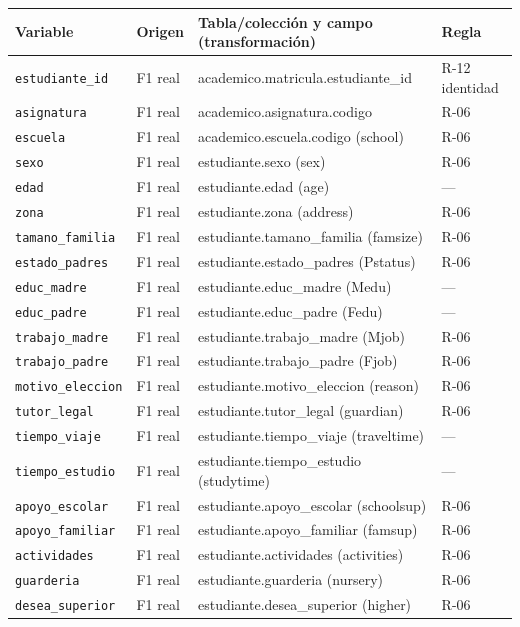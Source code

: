 \begin{tabular}{p{3.9cm}p{2.0cm}p{6.8cm}p{2.2cm}}
\toprule
Variable & Origen & Tabla/colección y campo (transformación) & Regla \\
\midrule
\texttt{estudiante\_id} & F1 real & academico.matricula.estudiante\_id & R-12 identidad \\
\texttt{asignatura} & F1 real & academico.asignatura.codigo & R-06 \\
\texttt{escuela} & F1 real & academico.escuela.codigo (school) & R-06 \\
\texttt{sexo} & F1 real & estudiante.sexo (sex) & R-06 \\
\texttt{edad} & F1 real & estudiante.edad (age) & — \\
\texttt{zona} & F1 real & estudiante.zona (address) & R-06 \\
\texttt{tamano\_familia} & F1 real & estudiante.tamano\_familia (famsize) & R-06 \\
\texttt{estado\_padres} & F1 real & estudiante.estado\_padres (Pstatus) & R-06 \\
\texttt{educ\_madre} & F1 real & estudiante.educ\_madre (Medu) & — \\
\texttt{educ\_padre} & F1 real & estudiante.educ\_padre (Fedu) & — \\
\texttt{trabajo\_madre} & F1 real & estudiante.trabajo\_madre (Mjob) & R-06 \\
\texttt{trabajo\_padre} & F1 real & estudiante.trabajo\_padre (Fjob) & R-06 \\
\texttt{motivo\_eleccion} & F1 real & estudiante.motivo\_eleccion (reason) & R-06 \\
\texttt{tutor\_legal} & F1 real & estudiante.tutor\_legal (guardian) & R-06 \\
\texttt{tiempo\_viaje} & F1 real & estudiante.tiempo\_viaje (traveltime) & — \\
\texttt{tiempo\_estudio} & F1 real & estudiante.tiempo\_estudio (studytime) & — \\
\texttt{apoyo\_escolar} & F1 real & estudiante.apoyo\_escolar (schoolsup) & R-06 \\
\texttt{apoyo\_familiar} & F1 real & estudiante.apoyo\_familiar (famsup) & R-06 \\
\texttt{actividades} & F1 real & estudiante.actividades (activities) & R-06 \\
\texttt{guarderia} & F1 real & estudiante.guarderia (nursery) & R-06 \\
\texttt{desea\_superior} & F1 real & estudiante.desea\_superior (higher) & R-06 \\

\end{tabular}
